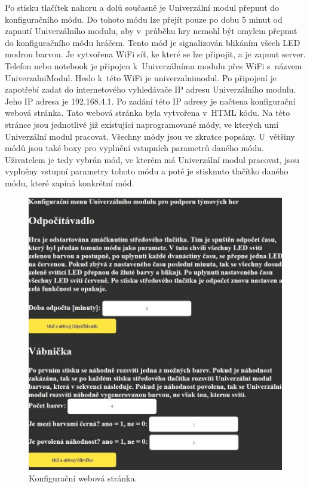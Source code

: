 Po stisku tlačítek nahoru a dolů současně je Univerzální modul přepnut do konfiguračního módu. Do tohoto módu lze přejít pouze po dobu 5 minut od zapnutí Univerzálního modulu, aby v~průběhu hry nemohl 
být omylem přepnut do konfiguračního módu hráčem. Tento mód je signalizován blikáním všech LED modrou barvou. Je vytvořena WiFi síť, ke které se lze připojit, a je zapnut server. Telefon nebo notebook je připojen 
k~Univerzálnímu modulu přes WiFi s~názvem UniverzalniModul. Heslo k~této WiFi je univerzalnimodul. Po připojení je zapotřebí zadat do internetového vyhledávače IP adresu Univerzálního modulu. Jeho IP adresa 
je 192.168.4.1. Po zadání této IP adresy je načtena konfigurační webová stránka. Tato webová stránka byla vytvořena v~HTML kódu. Na této stránce jsou jednotlivé již existující naprogramované módy, ve kterých umí 
Univerzální modul pracovat. Všechny módy jsou ve zkratce popsány. U~většiny módů jsou také boxy pro vyplnění vstupních parametrů daného módu. Uživatelem je tedy vybrán mód, ve kterém má Univerzální modul pracovat, 
jsou vyplněny vstupní parametry tohoto módu a poté je stisknuto tlačítko daného módu, které zapíná konkrétní mód. 

\begin{figure}[!h]
  \begin{center}
    \includegraphics[scale=0.45]{obrazky/konfiguracni_webova_stranka.jpg}
  \end{center}
  \caption[Konfigurační webová stránka]{Konfigurační webová stránka.}
\end{figure}

